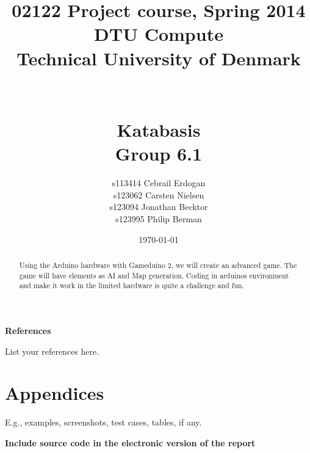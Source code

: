 \documentclass[12pt]{report}
\title{02122 Project course, Spring 2014 \\
DTU Compute \\
Technical University of Denmark \\~\\~\\ Katabasis \\ Group 6.1}
\author{s113414 Cebrail Erdogan \\
        s123062 Carsten Nielsen \\
        s123094 Jonathan Becktor\\
        s123995 Philip Berman   \\  }
\date{\today}
\begin{document}
\maketitle

\begin{abstract}
Using the Arduino hardware with Gameduino 2, we will create an advanced game.
The game will have elements as AI and Map generation.
Coding in arduinos environment and make it work in the
limited hardware is quite a challenge and fun.
\end{abstract}


\tableofcontents

\newpage



\newpage



















\newpage

\textbf{References}

List your references here.

\newpage


\chapter{Appendices}

 E.g., examples, screenshots, test cases, tables, if any.

\textbf{Include source code in the electronic version of the report}
\end{document}
